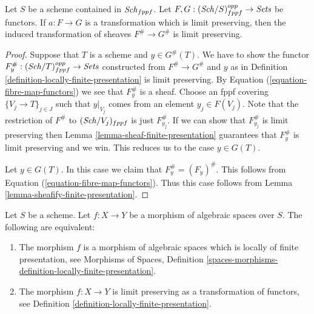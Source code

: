 \begin{lemma}
\label{lemma-sheafify-finite-presentation-map}
Let $S$ be a scheme contained in $\mathit{Sch}_{fppf}$.
Let $F, G : (\mathit{Sch}/S)_{fppf}^{opp} \to \textit{Sets}$ be functors.
If $a : F \to G$ is a transformation which is limit preserving,
then the induced transformation of sheaves
$F^\# \to G^\#$ is limit preserving.
\end{lemma}

\begin{proof}
Suppose that $T$ is a scheme and $y \in G^\#(T)$.
We have to show the functor
$F^\#_y : (\mathit{Sch}/T)_{fppf}^{opp} \to \textit{Sets}$
constructed from $F^\# \to G^\#$ and $y$ as in
Definition \ref{definition-locally-finite-presentation}
is limit preserving.
By Equation (\ref{equation-fibre-map-functors})
we see that $F^\#_y$ is a sheaf. Choose an fppf covering
$\{V_j \to T\}_{j \in J}$ such that $y|_{V_j}$ comes from
an element $y_j \in F(V_j)$.
Note that the restriction of $F^\#$ to $(\mathit{Sch}/V_j)_{fppf}$
is just $F^\#_{y_j}$. If we can show that $F^\#_{y_j}$ is
limit preserving then
Lemma \ref{lemma-sheaf-finite-presentation}
guarantees that $F^\#_y$ is limit preserving and
we win. This reduces us to the case $y \in G(T)$.

\medskip\noindent
Let $y \in G(T)$. In this case we claim that $F^\#_y = (F_y)^\#$.
This follows from
Equation (\ref{equation-fibre-map-functors}).
Thus this case follows from
Lemma \ref{lemma-sheafify-finite-presentation}.
\end{proof}

\begin{proposition}
\label{proposition-characterize-locally-finite-presentation}
Let $S$ be a scheme. Let $f : X \to Y$ be a morphism of algebraic
spaces over $S$. The following are equivalent:
\begin{enumerate}
\item The morphism $f$ is a morphism of algebraic spaces which is
locally of finite presentation, see
Morphisms of Spaces,
Definition \ref{spaces-morphisms-definition-locally-finite-presentation}.
\item The morphism $f : X \to Y$ is limit preserving as
a transformation of functors, see
Definition \ref{definition-locally-finite-presentation}.
\end{enumerate}
\end{proposition}

